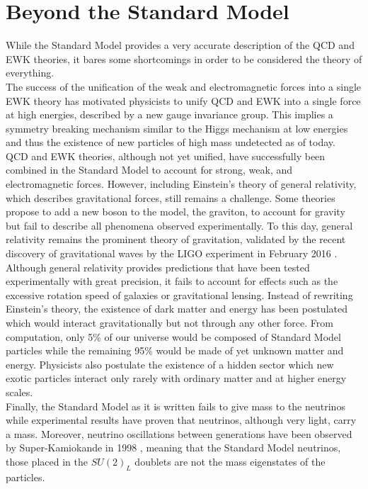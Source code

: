   \section{Beyond the Standard Model}

    While the Standard Model provides a very accurate description of the QCD and EWK theories, it bares some shortcomings in order to be considered the theory of everything. \\

    The success of the unification of the weak and electromagnetic forces into a single EWK theory has motivated physicists to unify QCD and EWK into a single force at high energies, described by a new gauge invariance group. This implies a symmetry breaking mechanism similar to the Higgs mechanism at low energies and thus the existence of new particles of high mass undetected as of today. \\

    QCD and EWK theories, although not yet unified, have successfully been combined in the Standard Model to account for strong, weak, and electromagnetic forces. However, including Einstein's theory of general relativity, which describes gravitational forces, still remains a challenge. Some theories propose to add a new boson to the model, the graviton, to account for gravity but fail to describe all phenomena observed experimentally. To this day, general relativity remains the prominent theory of gravitation, validated by the recent discovery of gravitational waves by the LIGO experiment in February 2016 \cite{PhysRevLett.116.061102}. \\

    Although general relativity provides predictions that have been tested experimentally with great precision, it fails to account for effects such as the excessive rotation speed of galaxies or gravitational lensing. Instead of rewriting Einstein's theory, the existence of dark matter and energy has been postulated which would interact gravitationally but not through any other force. From computation, only 5\% of our universe would be composed of Standard Model particles while the remaining 95\% would be made of yet unknown matter and energy. Physicists also postulate the existence of a hidden sector which new exotic particles interact only rarely with ordinary matter and at higher energy scales. \\

    Finally, the Standard Model as it is written fails to give mass to the neutrinos while experimental results have proven that neutrinos, although very light, carry a mass. Moreover, neutrino oscillations between generations have been observed by Super-Kamiokande in 1998 \cite{Fukuda:1998mi}, meaning that the Standard Model neutrinos, those placed in the $ SU(2)_L $ doublets are not the mass eigenstates of the particles. \\

